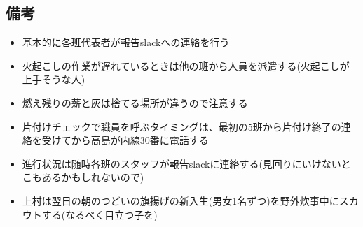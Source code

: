 \subsection{備考}
\begin{itemize}
\item 基本的に各班代表者が報告slackへの連絡を行う
\item 火起こしの作業が遅れているときは他の班から人員を派遣する(火起こしが上手そうな人)
\item 燃え残りの薪と灰は捨てる場所が違うので注意する
\item 片付けチェックで職員を呼ぶタイミングは、最初の5班から片付け終了の連絡を受けてから高島が内線30番に電話する
\item 進行状況は随時各班のスタッフが報告slackに連絡する(見回りにいけないとこもあるかもしれないので)
\item 上村は翌日の朝のつどいの旗揚げの新入生(男女1名ずつ)を野外炊事中にスカウトする(なるべく目立つ子を)
\end{itemize}


%
